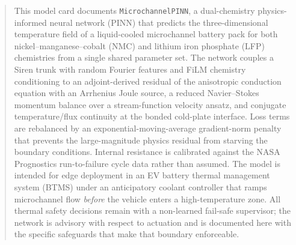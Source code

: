\documentclass[journal,10pt,compsoc,onecolumn]{IEEEtran}
\begin{document}
\vspace{6pt}
\noindent{}

\begin{abstract}
\noindent
This model card documents \texttt{MicrochannelPINN}, a dual-chemistry
physics-informed neural network (PINN) that predicts the three-dimensional
temperature field of a liquid-cooled microchannel battery pack for both
nickel--manganese--cobalt (NMC) and lithium iron phosphate (LFP) chemistries
from a single shared parameter set. The network couples a Siren trunk with
random Fourier features and FiLM chemistry conditioning to an adjoint-derived
residual of the anisotropic conduction equation with an Arrhenius Joule source,
a reduced Navier--Stokes momentum balance over a stream-function velocity
ansatz, and conjugate temperature/flux continuity at the bonded cold-plate
interface. Loss terms are rebalanced by an exponential-moving-average
gradient-norm penalty that prevents the large-magnitude physics residual from
starving the boundary conditions. Internal resistance is calibrated against the
NASA Prognostics run-to-failure cycle data rather than assumed. The model is
intended for edge deployment in an EV battery thermal management system
(BTMS) under an anticipatory coolant controller that ramps microchannel flow
\emph{before} the vehicle enters a high-temperature zone. All thermal safety
decisions remain with a non-learned fail-safe supervisor; the network is
advisory with respect to actuation and is documented here with the specific
safeguards that make that boundary enforceable.
\end{abstract}
\end{document}
